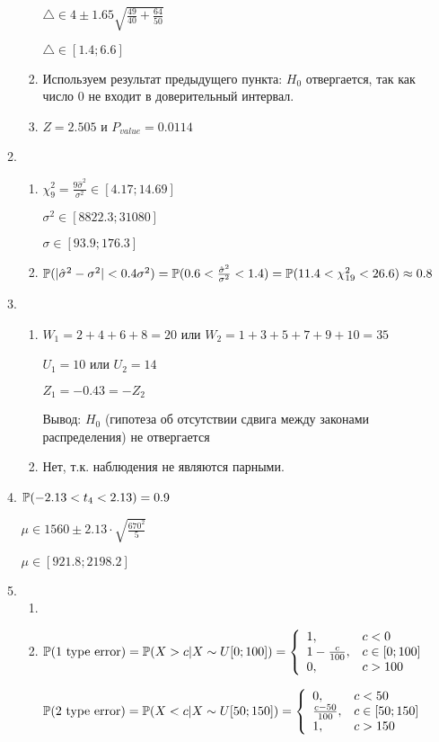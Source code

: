 \begin{enumerate}[resume]
\begin{enumerate}
\begin{enumerate}
$\triangle \in 4 \pm 1.65\sqrt{\frac{49}{40}+\frac{64}{50}}$

$\triangle \in [1.4;6.6]$
\item Используем результат предыдущего пункта: $H_{0}$ отвергается, так как число 0 не входит в доверительный интервал.
\item $Z=2.505$ и $P_{value}=0.0114$
\end{enumerate}
\item
\begin{enumerate}
\item $\chi_{9}^{2}=\frac{9\hat{\sigma}^{2}}{\sigma^{2}} \in [4.17; 14.69]$

$\sigma^{2} \in [8822.3; 31080]$

$\sigma \in [93.9; 176.3] $
\item  $\P(|\hat{\sigma}^{2}-\sigma^{2}|<0.4\sigma^{2})=\P(0.6<\frac{\hat{\sigma}^{2}}{\sigma^{2}}<1.4)=\P(11.4<\chi_{19}^{2}<26.6)\approx 0.8$
\end{enumerate}
\item
\begin{enumerate}
\item $W_{1}=2+4+6+8=20$ или $W_{2}=1+3+5+7+9+10=35$

$U_{1}=10$ или $U_{2}=14$

$Z_{1}=-0.43=-Z_{2}$

Вывод: $H_{0}$ (гипотеза об отсутствии сдвига между законами распределения) не отвергается
\item Нет, т.к. наблюдения не являются парными.
\end{enumerate}
\item  $\P(-2.13<t_{4}<2.13)=0.9$

$\mu \in 1560 \pm 2.13\cdot \sqrt{\frac{670^{2}}{5}}$

$\mu \in [921.8;2198.2]$
\item
\begin{enumerate}
\item
\item  $\P(\text{1 type error})=\P(X>c|X\sim U[0;100])= \left\{
\begin{array}{ll}
  1, & c<0 \\
  1-\frac{c}{100}, & c \in [0;100] \\
  0, & c>100 \\
\end{array}
\right.$

$\P(\text{2 type error})=\P(X<c|X\sim U[50;150])= \left\{
\begin{array}{ll}
  0, & c<50 \\
  \frac{c-50}{100}, & c \in [50;150] \\
  1, & c>150 \\
\end{array}
\right.$


\end{enumerate}
\end{enumerate}
\end{enumerate}
